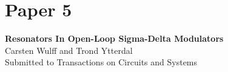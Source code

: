 \section{Paper 5}
\textbf{\Large Resonators In Open-Loop Sigma-Delta Modulators}\\
\indent Carsten Wulff and Trond Ytterdal\\
\indent Submitted to Transactions on Circuits and Systems\\

